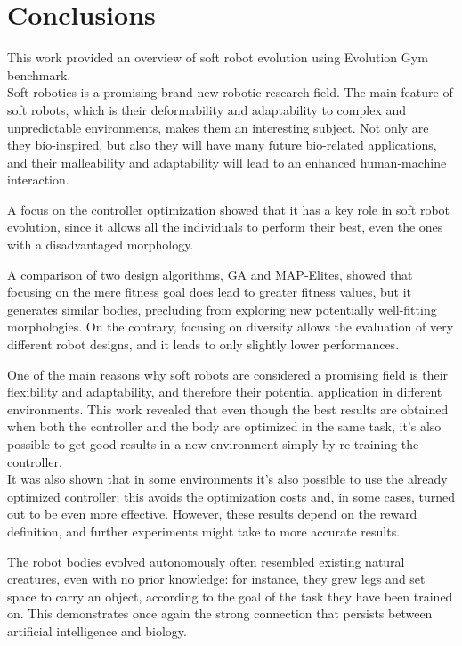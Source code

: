 \chapter{Conclusions}
\label{cha:coclusion}

This work provided an overview of soft robot evolution using Evolution Gym benchmark.\\
Soft robotics is a promising brand new robotic research field.
The main feature of soft robots, which is their deformability and adaptability to complex and unpredictable environments, makes them an interesting subject. 
Not only are they bio-inspired, but also they will have many future bio-related applications, and their malleability and adaptability will lead to an enhanced human-machine interaction.

A focus on the controller optimization showed that it has a key role in soft robot evolution, since it allows all the individuals to perform their best, even the ones with a disadvantaged morphology.

A comparison of two design algorithms, GA and MAP-Elites, showed that focusing on the mere fitness goal does lead to greater fitness values, but it generates similar bodies, precluding from exploring new potentially well-fitting morphologies. On the contrary, focusing on diversity allows the evaluation of very different robot designs, and it leads to only slightly lower performances.

One of the main reasons why soft robots are considered a promising field is their flexibility and adaptability, and therefore their potential application in different environments.
This work revealed that even though the best results are obtained when both the controller and the body are optimized in the same task, it's also possible to get good results in a new environment simply by re-training the controller.\\
It was also shown that in some environments it's also possible to use the already optimized controller; this avoids the optimization costs and, in some cases, turned out to be even more effective.
However, these results depend on the reward definition, and further experiments might take to more accurate results.

The robot bodies evolved autonomously often resembled existing natural creatures, even with no prior knowledge: for instance, they grew legs and set space to carry an object, according to the goal of the task they have been trained on. This demonstrates once again the strong connection that persists between artificial intelligence and biology.


